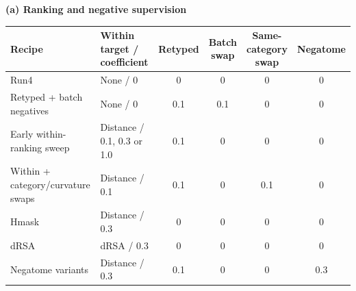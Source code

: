 \begin{table}[p]
    \centering
    \small
    \setlength{\tabcolsep}{4pt}
    \renewcommand{\arraystretch}{1.15}
    \textbf{(a) Ranking and negative supervision}\par\medskip
    \begin{tabularx}{\textwidth}{@{}>{\raggedright\arraybackslash}p{4.0cm}>{\raggedright\arraybackslash}Xcccc@{}}
        \toprule
        Recipe & Within target / coefficient & Retyped & \shortstack{Batch\\swap} & \shortstack{Same-category\\swap} & Negatome \\
        \midrule
        Run4 & None / 0 & 0 & 0 & 0 & 0 \\
        Retyped + batch negatives & None / 0 & 0.1 & 0.1 & 0 & 0 \\
        Early within-ranking sweep & Distance / 0.1, 0.3 or 1.0 & 0.1 & 0 & 0 & 0 \\
        Within + category/curvature swaps & Distance / 0.1 & 0.1 & 0 & 0.1 & 0 \\
        Hmask & Distance / 0.3 & 0 & 0 & 0 & 0 \\
        dRSA & dRSA / 0.3 & 0 & 0 & 0 & 0 \\
        Negatome variants & Distance / 0.3 & 0.1 & 0 & 0 & 0.3 \\
        \bottomrule
    \end{tabularx}


\end{table}
